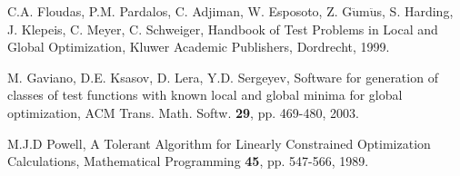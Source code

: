 \documentclass[symmetry,article,submit,moreauthors,pdftex]{mdpi}
\begin{document}
\begin{thebibliography}{10}
C.A. Floudas, P.M. Pardalos, C. Adjiman, W. Esposoto,
Z. G$\ddot{\mbox{u}}$m$\ddot{\mbox{u}}$s, S. Harding, J. Klepeis,
C. Meyer, C. Schweiger, Handbook of Test Problems in Local and Global
Optimization, Kluwer Academic Publishers, Dordrecht, 1999.

M. Gaviano, D.E. Ksasov, D. Lera, Y.D. Sergeyev, Software
for generation of classes of test functions with known local and global
minima for global optimization, ACM Trans. Math. Softw. \textbf{29},
pp. 469-480, 2003.

M.J.D Powell, A Tolerant Algorithm for Linearly Constrained
Optimization Calculations, Mathematical Programming \textbf{45}, pp.
547-566, 1989. 
\end{thebibliography}
\end{document}
